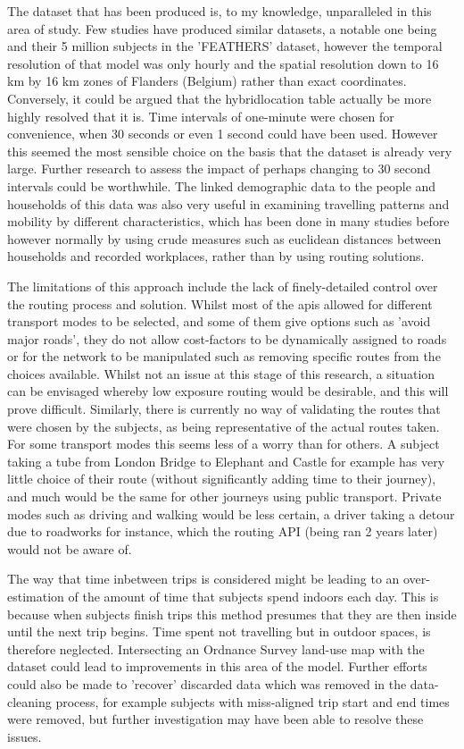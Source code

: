 The dataset that has been produced is, to my knowledge, unparalleled in this area of study. Few studies have produced similar datasets, a notable one being \cite{Dhondt2012} and their 5 million subjects in the 'FEATHERS' dataset, however the temporal resolution of that model was only hourly and the spatial resolution down to 16 km by 16 km zones of Flanders (Belgium) rather than exact coordinates. Conversely, it could be argued that the hybrid\textunderscore location table actually be more highly resolved that it is. Time intervals of one-minute were chosen for convenience, when 30 seconds or even 1 second could have been used. However this seemed the most sensible choice on the basis that the dataset is already very large. Further research to assess the impact of perhaps changing to 30 second intervals could be worthwhile. The linked demographic data to the people and households of this data was also very useful in examining travelling patterns and mobility by different characteristics, which has been done in many studies before however normally by using crude measures such as euclidean distances between households and recorded workplaces, rather than by using routing solutions.

The limitations of this approach include the lack of finely-detailed control over the routing process and solution. Whilst most of the \gls{api}s allowed for different transport modes to be selected, and some of them give options such as 'avoid major roads', they do not allow cost-factors to be dynamically assigned to roads or for the network to be manipulated such as removing specific routes from the choices available. Whilst not an issue at this stage of this research, a situation can be envisaged whereby low exposure routing would be desirable, and this will prove difficult. Similarly, there is currently no way of validating the routes that were chosen by the subjects, as being representative of the actual routes taken. For some transport modes this seems less of a worry than for others. A subject taking a tube from London Bridge to Elephant and Castle for example has very little choice of their route (without significantly adding time to their journey), and much would be the same for other journeys using public transport. Private modes such as driving and walking would be less certain, a driver taking a detour due to roadworks for instance, which the routing API (being ran 2 years later) would not be aware of.

The way that time inbetween trips is considered might be leading to an over-estimation of the amount of time that subjects spend indoors each day. This is because when subjects finish trips this method presumes that they are then inside until the next trip begins. Time spent not travelling but in outdoor spaces, is therefore neglected. Intersecting an Ordnance Survey land-use map with the dataset could lead to improvements in this area of the model. Further efforts could also be made to 'recover' discarded data which was removed in the data-cleaning process, for example subjects with miss-aligned trip start and end times were removed, but further investigation may have been able to resolve these issues.

